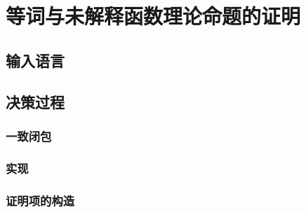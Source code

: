 \chapter{等词与未解释函数理论命题的证明}
\label{chap:euf}

\section{输入语言}

\section{决策过程}
\subsection{一致闭包}
\subsection{实现}
\subsection{证明项的构造}
